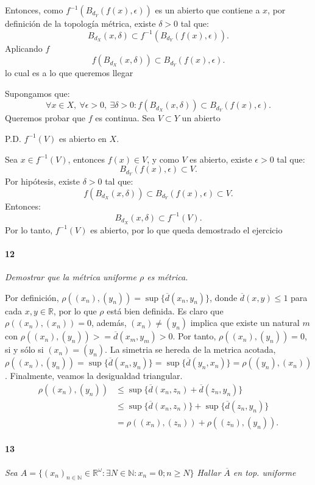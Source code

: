 \documentclass[12pt]{article}
\begin{document}
Entonces, como \( f^{-1}(B_{d_Y}(f(x), \epsilon)) \) es un abierto que contiene a \( x \), por definición de la topología métrica, existe \( \delta > 0 \) tal que:
\[
B_{d_X}(x, \delta) \subset f^{-1}(B_{d_Y}(f(x), \epsilon)).
\]
Aplicando \( f \)
\[
f(B_{d_X}(x, \delta)) \subset B_{d_Y}(f(x), \epsilon).
\]
lo cual es a lo que queremos llegar

\vspace{1em}
Supongamos que:
\[
\forall x \in X,\ \forall \epsilon > 0,\ \exists \delta > 0 : f(B_{d_X}(x, \delta)) \subset B_{d_Y}(f(x), \epsilon).
\]
Queremos probar que \( f \) es continua.  
Sea \( V \subset Y \) un abierto

P.D. \( f^{-1}(V) \) es abierto en \( X \).  

Sea \( x \in f^{-1}(V) \), entonces \( f(x) \in V \), y como \( V \) es abierto, existe \( \epsilon > 0 \) tal que:
\[
B_{d_Y}(f(x), \epsilon) \subset V.
\]
Por hipótesis, existe \( \delta > 0 \) tal que:
\[
f(B_{d_X}(x, \delta)) \subset B_{d_Y}(f(x), \epsilon) \subset V.
\]
Entonces:
\[
B_{d_X}(x, \delta) \subset f^{-1}(V).
\]
Por lo tanto, \( f^{-1}(V) \) es abierto, por lo que queda demostrado el ejercicio

\paragraph{12}
\textit{Demostrar que la métrica uniforme $\rho$ es métrica.}

Por definición, $\rho((x_n),(y_n))=\sup{\{\overline{d}(x_n,y_n)\}}$, donde $\overline{d}(x,y) \leq 1$ para cada $x,y \in \mathbb{R}$, por lo que $\rho$ está bien definida.
Es claro que $\rho((x_n),(x_n))=0$, además, $(x_n) \neq (y_n)$ implica que existe un natural $m$ con $\rho((x_n),(y_n))>=\overline{d}(x_m,y_m)>0$. Por tanto, $\rho((x_n),(y_n))=0$, si y sólo si $(x_n)=(y_n)$.
La simetria se hereda de la metrica acotada, $\rho((x_n),(y_n))=\sup{\{\overline{d}(x_n,y_n)\}}=\sup{\{\overline{d}(y_n,x_n)\}}=\rho((y_n),(x_n))$. Finalmente, veamos la desigualdad triangular.
\begin{align*}
    \rho((x_n),(y_n)) &\leq \sup{\{\overline{d}(x_n,z_n)+\overline{d}(z_n,y_n)\}} \\
                      &\leq \sup{\{\overline{d}(x_n,z_n)\}}+\sup{\{\overline{d}(z_n,y_n)\}}\\
                      &=\rho((x_n),(z_n))+\rho((z_n),(y_n)).
\end{align*}
\paragraph{13}
\textit{Sea $A=\{(x_n)_{n\in\mathbb{N}}\in\mathbb{R}^\omega : \exists N\in\mathbb{N}: x_n =0 ; n \geq N \}$
Hallar $\overline{A}$ en top. uniforme}
\end{document}
